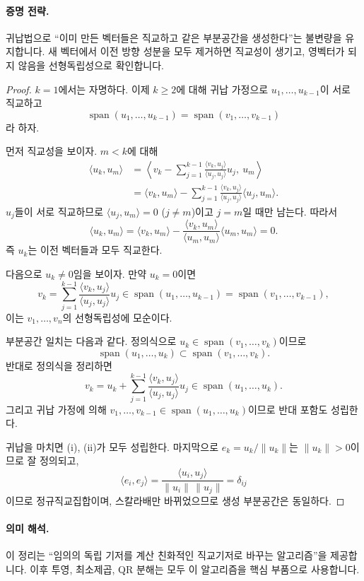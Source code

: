 \paragraph{증명 전략.}
귀납법으로 ``이미 만든 벡터들은 직교하고 같은 부분공간을 생성한다''는 불변량을 유지합니다. 새 벡터에서 이전 방향 성분을 모두 제거하면 직교성이 생기고, 영벡터가 되지 않음을 선형독립성으로 확인합니다.

\begin{proof}
$k=1$에서는 자명하다. 이제 $k\ge2$에 대해 귀납 가정으로 $u_1,\dots,u_{k-1}$이 서로 직교하고
$$
\operatorname{span}(u_1,\dots,u_{k-1})
=\operatorname{span}(v_1,\dots,v_{k-1})
$$
라 하자.

먼저 직교성을 보이자. $m<k$에 대해
\begin{align*}
\langle u_k,u_m\rangle
&=\left\langle v_k-\sum_{j=1}^{k-1}\frac{\langle v_k,u_j\rangle}{\langle u_j,u_j\rangle}u_j,\ u_m\right\rangle\\
&=\langle v_k,u_m\rangle-\sum_{j=1}^{k-1}\frac{\langle v_k,u_j\rangle}{\langle u_j,u_j\rangle}\langle u_j,u_m\rangle.
\end{align*}
$u_j$들이 서로 직교하므로 $\langle u_j,u_m\rangle=0$ ($j\ne m$)이고 $j=m$일 때만 남는다. 따라서
$$
\langle u_k,u_m\rangle
=\langle v_k,u_m\rangle
-\frac{\langle v_k,u_m\rangle}{\langle u_m,u_m\rangle}\langle u_m,u_m\rangle
=0.
$$
즉 $u_k$는 이전 벡터들과 모두 직교한다.

다음으로 $u_k\ne0$임을 보이자. 만약 $u_k=0$이면
$$
v_k=\sum_{j=1}^{k-1}\frac{\langle v_k,u_j\rangle}{\langle u_j,u_j\rangle}u_j
\in \operatorname{span}(u_1,\dots,u_{k-1})
=\operatorname{span}(v_1,\dots,v_{k-1}),
$$
이는 $v_1,\dots,v_n$의 선형독립성에 모순이다.

부분공간 일치는 다음과 같다. 정의식으로 $u_k\in\operatorname{span}(v_1,\dots,v_k)$이므로
$$
\operatorname{span}(u_1,\dots,u_k)\subset \operatorname{span}(v_1,\dots,v_k).
$$
반대로 정의식을 정리하면
$$
v_k=u_k+\sum_{j=1}^{k-1}\frac{\langle v_k,u_j\rangle}{\langle u_j,u_j\rangle}u_j
\in\operatorname{span}(u_1,\dots,u_k).
$$
그리고 귀납 가정에 의해 $v_1,\dots,v_{k-1}\in\operatorname{span}(u_1,\dots,u_k)$이므로 반대 포함도 성립한다.

귀납을 마치면 (i), (ii)가 모두 성립한다. 마지막으로 $e_k=u_k/\|u_k\|$는 $\|u_k\|>0$이므로 잘 정의되고,
$$
\langle e_i,e_j\rangle
=\frac{\langle u_i,u_j\rangle}{\|u_i\|\,\|u_j\|}
=\delta_{ij}
$$
이므로 정규직교집합이며, 스칼라배만 바뀌었으므로 생성 부분공간은 동일하다.
\end{proof}

\paragraph{의미 해석.}
이 정리는 ``임의의 독립 기저를 계산 친화적인 직교기저로 바꾸는 알고리즘''을 제공합니다. 이후 투영, 최소제곱, QR 분해는 모두 이 알고리즘을 핵심 부품으로 사용합니다.

